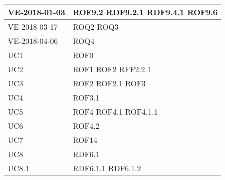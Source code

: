 \documentclass[../AnalisideiRequisiti.tex]{subfiles}
\begin{document}
\begin{longtable}{| p{4cm} | p{4cm} |}
	\hline
		\newline VE-2018-01-03 & \newline ROF9.2 \newline RDF9.2.1 \newline RDF9.4.1 \newline ROF9.6 \\[1em]
	\hline
		\newline VE-2018-03-17 & \newline ROQ2 \newline ROQ3 \\[1em]
	\hline
		\newline VE-2018-04-06 & \newline ROQ4 \\[1em]	
		

	\hline
		\newline UC1 &  \newline ROF0 \\[1em]
	\hline
		\newline UC2 &  \newline ROF1 \newline ROF2 \newline RFF2.2.1   \\[1em]	
		\hline
		\newline UC3 &  \newline ROF2 \newline ROF2.1 \newline ROF3 \\[1em]	
		\hline
		\newline UC4 &  \newline ROF3.1 \\[1em]	
		\hline
		\newline UC5 &  \newline ROF4 \newline ROF4.1 \newline ROF4.1.1 \\[1em]
		\hline
		\newline UC6 &  \newline ROF4.2 \\[1em]
		\hline
		\newline UC7 &  \newline ROF14 \\[1em]
		\hline
		\newline UC8 &  \newline RDF6.1 \\[1em]
		\hline
		\newline UC8.1 &  \newline RDF6.1.1 \newline RDF6.1.2 \\[1em]

\end{longtable}
\end{document}
